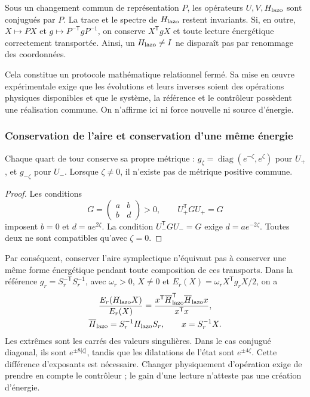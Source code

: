 Sous un changement commun de représentation \(P\), les opérateurs
\(U,V,H_{\rm lazo}\) sont conjugués par \(P\).
La trace et le spectre de \(H_{\rm lazo}\) restent invariants.
Si, en outre, \(X\mapsto PX\) et
\(g\mapsto P^{-\mathsf T}gP^{-1}\), on conserve
\(X^{\mathsf T}gX\) et toute lecture énergétique correctement
transportée. Ainsi, un \(H_{\rm lazo}\ne I\) ne disparaît pas par
renommage des coordonnées.

Cela constitue un protocole mathématique relationnel fermé.
Sa mise en œuvre expérimentale exige que les évolutions et leurs
inverses soient des opérations physiques disponibles et que le système,
la référence et le contrôleur possèdent une réalisation commune.
On n’affirme ici ni force nouvelle ni source d’énergie.

\subsubsection{Conservation de l’aire et conservation d’une même énergie}
\label{md:comp:area-energia}

\begin{proposition}
\label{md:comp:prop-metrica}
Chaque quart de tour conserve sa propre métrique :
\(g_\zeta=\operatorname{diag}(e^{-\zeta},e^\zeta)\) pour \(U_+\),
et \(g_{-\zeta}\) pour \(U_-\). Lorsque \(\zeta\ne0\), il n’existe pas
de métrique positive commune.
\end{proposition}
\begin{proof}
Les conditions
\[
 G=\begin{pmatrix}a&b\\b&d\end{pmatrix}>0,
 \qquad U_+^{\mathsf T}GU_+=G
\]
imposent \(b=0\) et \(d=ae^{2\zeta}\).
La condition \(U_-^{\mathsf T}GU_-=G\) exige
\(d=ae^{-2\zeta}\). Toutes deux ne sont compatibles qu’avec \(\zeta=0\).
\end{proof}

Par conséquent, conserver l’aire symplectique n’équivaut pas à conserver
une même forme énergétique pendant toute composition de ces
transports. Dans la référence
\(g_r=S_r^{-\mathsf T}S_r^{-1}\), avec \(\omega_r>0\),
\(X\ne0\) et \(E_r(X)=\omega_r X^{\mathsf T}g_rX/2\), on a
\begin{equation}
 \begin{gathered}
 \frac{E_r(H_{\rm lazo}X)}{E_r(X)}
 =\frac{x^{\mathsf T}\overline{H}_{\rm lazo}^{\mathsf T}
                   \overline{H}_{\rm lazo}x}{x^{\mathsf T}x},\\
 \overline{H}_{\rm lazo}=S_r^{-1}H_{\rm lazo}S_r,\qquad
 x=S_r^{-1}X.
 \end{gathered}
 \label{md:comp:cociente-energia}
\end{equation}
Les extrêmes sont les carrés des valeurs singulières.
Dans le cas conjugué diagonal, ils sont \(e^{\pm8|\zeta|}\), tandis que
les dilatations de l’état sont \(e^{\pm4\zeta}\).
Cette différence d’exposants est nécessaire. Changer physiquement
d’opération exige de prendre en compte le contrôleur ; le gain d’une
lecture n’atteste pas une création d’énergie.

